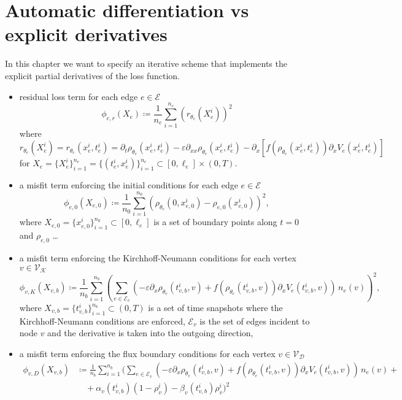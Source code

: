 \section{Automatic differentiation vs explicit derivatives}
\label{ch3:sec3}

In this chapter we want to specify an iterative scheme that implements the explicit partial derivatives of the loss function.

\begin{itemize}
    \item residual loss term for each edge $e \in \mathcal{E}$ \begin{equation*} \phi_{e,r} (X_e) \coloneqq \frac{1}{n_e} \sum_{i=1}^{n_e} (r_{\theta_e} (X_e^i))^2 \end{equation*} where \begin{equation*} r_{\theta_e} (X_e^i) = r_{\theta_e} (x_e^i, t_e^i) = \partial_t \rho_{\theta_{e}} (x_{e}^i , t_{e}^i) - \varepsilon \partial_{xx} \rho_{\theta_e}(x_e^i, t_e^i) - \partial_x [f(\rho_{\theta_e}(x_e^i, t_e^i)) \partial_x V_e(x_e^i, t_e^i)] \end{equation*} for $X_e = \{X_e^i\}_{i=1}^{n_e} = \{(t_e^i, x_e^i)\}_{i=1}^{n_e} \subset [0,\ell_e] \times (0, T)$.
    \item a misfit term enforcing the initial conditions for each edge $e \in \mathcal{E}$ \begin{equation*} \phi_{e,0} (X_{e,0}) \coloneqq \frac{1}{n_0} \sum_{i=1}^{n_0} (\rho_{\theta_e} (0,x_{e,0}^i) - \rho_{e,0}(x_{e,0}^i))^2, \end{equation*} where $X_{e,0} = \{x_{e,0}^i\}_{i=1}^{n_0} \subset [0, \ell_e]$ is a set of boundary points along $t=0$ and $\rho_{e,0}$ \ldots
    \item a misfit term enforcing the Kirchhoff-Neumann conditions for each vertex $v \in \mathcal{V}_\mathcal{K}$ \begin{equation*} \phi_{v,K} (X_{v,b}) \coloneqq \frac{1}{n_b} \sum_{i=1}^{n_b} (\sum_{e \in \mathcal{E}_v} (- \varepsilon \partial_x \rho_{\theta_e} (t_{v,b}^i, v) + f(\rho_{\theta_e} (t_{v,b}^i, v)) \partial_x V_e(t_{v,b}^i, v)) \, n_e (v))^2, \end{equation*} where $X_{v,b} = \{t_{v,b}^i\}_{i=1}^{n_b} \subset (0,T)$ is a set of time snapshots where the Kirchhoff-Neumann conditions are enforced, $\mathcal{E}_v$ is the set of edges incident to node $v$ and the derivative is taken into the outgoing direction,
    \item a misfit term enforcing the flux boundary conditions for each vertex $v \in \mathcal{V}_\mathcal{D}$ \begin{align*} \phi_{v,D} (X_{v,b}) & \coloneqq \frac{1}{n_b} \sum_{i=1}^{n_b} ( \sum_{e\in \mathcal{E}_v} (-\varepsilon \partial_x \rho_{\theta_e} (t_{v,b}^i, v) + f(\rho_{\theta_e} (t_{v,b}^i, v)) \partial_x V_e(t_{v,b}^i, v)) \, n_e (v) + \\ & \quad + \alpha_v(t_{v,b}^i) (1-\rho_v^i) - \beta_v(t_{v,b}^i) \rho_v^i)^2 \end{align*}

\end{itemize}
